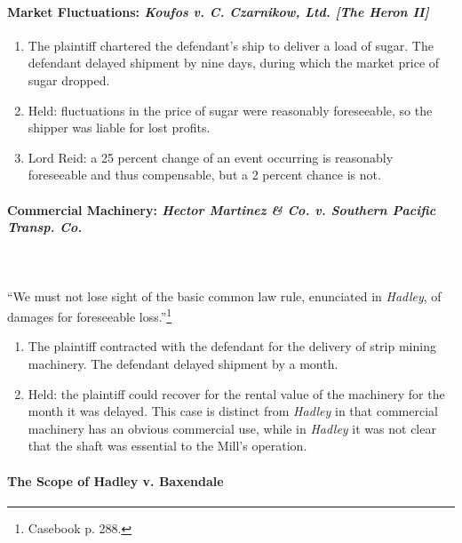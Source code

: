 \paragraph{Market Fluctuations: \emph{Koufos v. C. Czarnikow, Ltd. [The Heron 
II]}}

\begin{enumerate}
    \item The plaintiff chartered the defendant's ship to deliver a load of 
    sugar. The defendant delayed shipment by nine days, during which the 
    market price of sugar dropped.
    \item Held: fluctuations in the price of sugar were reasonably 
    foreseeable, so the shipper was liable for lost profits.
    \item Lord Reid: a 25 percent change of an event occurring is reasonably 
    foreseeable and thus compensable, but a 2 percent chance is not.
\end{enumerate}

\paragraph{Commercial Machinery: \emph{Hector Martinez \& Co. v. Southern 
Pacific Transp. Co.}}
~\\\\
``We must not lose sight of the basic common law rule, enunciated in 
\emph{Hadley}, of damages for foreseeable loss.''\footnote{Casebook p. 288.}

\begin{enumerate}
    \item The plaintiff contracted with the defendant for the delivery of 
    strip mining machinery. The defendant delayed shipment by a month.
    \item Held: the plaintiff could recover for the rental value of the 
    machinery for the month it was delayed. This case is distinct from 
    \emph{Hadley} in that commercial machinery has an obvious commercial use, 
    while in \emph{Hadley} it was not clear that the shaft was essential to 
    the Mill's operation.
\end{enumerate}

\paragraph{The Scope of Hadley v. Baxendale}

